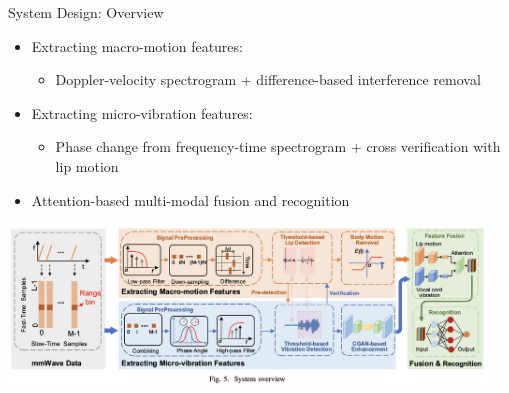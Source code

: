 \documentclass[dvipsnames, handout]{beamer}
\newcommand{\1}{\mathds{1}}	%
\begin{document}
\begin{frame}[t]{System Design: Overview}

\begin{itemize}
\item Extracting macro-motion features:
\begin{itemize}
\item Doppler-velocity spectrogram + difference-based interference removal
\end{itemize}

\item Extracting micro-vibration features:
\begin{itemize}
\item Phase change from frequency-time spectrogram + cross verification with lip motion
\end{itemize}

\item Attention-based multi-modal fusion and recognition
\end{itemize}

\begin{center}
\includegraphics[width=0.95\textwidth]{imgs/mmmic-fig5.png}
\end{center}

\end{frame}
\end{document}
